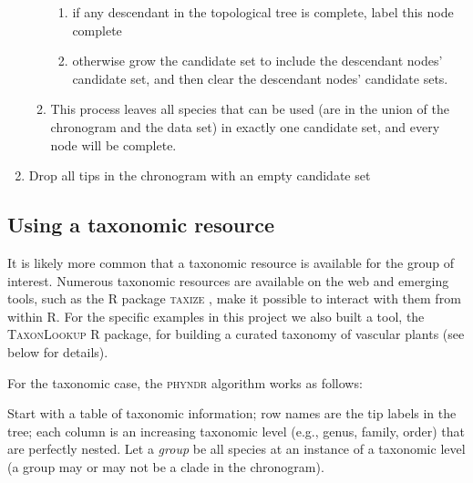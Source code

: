 \documentclass[a4paper,11pt]{article}
\begin{document}
\begin{enumerate}
\begin{enumerate}
\begin{enumerate}
    \item if any descendant in the topological tree is complete, label this node complete
    \item otherwise grow the candidate set to include the descendant nodes' candidate set, and then clear the descendant nodes' candidate sets.
\end{enumerate}
  \item This process leaves all species that can be used (are in the union of the chronogram and the data set) in exactly one candidate set, and every node will be complete.
\end{enumerate}
\item Drop all tips in the chronogram with an empty candidate set
\end{enumerate}

\subsection{Using a taxonomic resource}

It is likely more common that a taxonomic resource is available for the group of interest. Numerous taxonomic resources are available on the web and emerging tools, such as the R package \textsc{taxize} \citep{taxize}, make it possible to interact with them from within R. For the specific examples in this project we also built a tool, the \textsc{TaxonLookup} R package, for building a curated taxonomy of vascular plants (see below for details).

For the taxonomic case, the \textsc{phyndr} algorithm works as follows:

Start with a table of taxonomic information; row names are the tip labels in the tree; each column is an increasing taxonomic level (e.g., genus, family, order) that are perfectly nested.  Let a \emph{group} be all species at an instance of a taxonomic level (a group may or may not be a clade in the chronogram).
\end{document}
